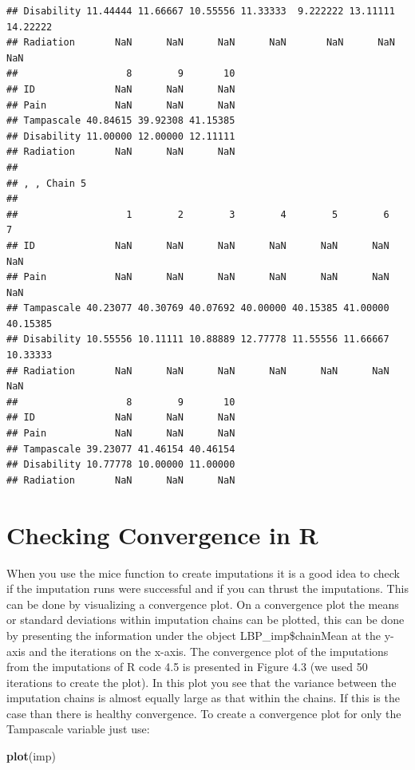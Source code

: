 \documentclass[]{book}
\newenvironment{Shaded}{\begin{snugshade}}{\end{snugshade}}
\newcommand{\KeywordTok}[1]{\textcolor[rgb]{0.13,0.29,0.53}{\textbf{#1}}}
\newcommand{\NormalTok}[1]{#1}
\begin{document}
\begin{verbatim}
## Disability 11.44444 11.66667 10.55556 11.33333  9.222222 13.11111 14.22222
## Radiation       NaN      NaN      NaN      NaN       NaN      NaN      NaN
##                   8        9       10
## ID              NaN      NaN      NaN
## Pain            NaN      NaN      NaN
## Tampascale 40.84615 39.92308 41.15385
## Disability 11.00000 12.00000 12.11111
## Radiation       NaN      NaN      NaN
## 
## , , Chain 5
## 
##                   1        2        3        4        5        6        7
## ID              NaN      NaN      NaN      NaN      NaN      NaN      NaN
## Pain            NaN      NaN      NaN      NaN      NaN      NaN      NaN
## Tampascale 40.23077 40.30769 40.07692 40.00000 40.15385 41.00000 40.15385
## Disability 10.55556 10.11111 10.88889 12.77778 11.55556 11.66667 10.33333
## Radiation       NaN      NaN      NaN      NaN      NaN      NaN      NaN
##                   8        9       10
## ID              NaN      NaN      NaN
## Pain            NaN      NaN      NaN
## Tampascale 39.23077 41.46154 40.46154
## Disability 10.77778 10.00000 11.00000
## Radiation       NaN      NaN      NaN
\end{verbatim}

\section{Checking Convergence in R}\label{checking-convergence-in-r}

When you use the mice function to create imputations it is a good idea
to check if the imputation runs were successful and if you can thrust
the imputations. This can be done by visualizing a convergence plot. On
a convergence plot the means or standard deviations within imputation
chains can be plotted, this can be done by presenting the information
under the object LBP\_imp\$chainMean at the y-axis and the iterations on
the x-axis. The convergence plot of the imputations from the imputations
of R code 4.5 is presented in Figure 4.3 (we used 50 iterations to
create the plot). In this plot you see that the variance between the
imputation chains is almost equally large as that within the chains. If
this is the case than there is healthy convergence. To create a
convergence plot for only the Tampascale variable just use:

\begin{Shaded}
\begin{Highlighting}[]
\KeywordTok{plot}\NormalTok{(imp)}
\end{Highlighting}
\end{Shaded}
\end{document}
